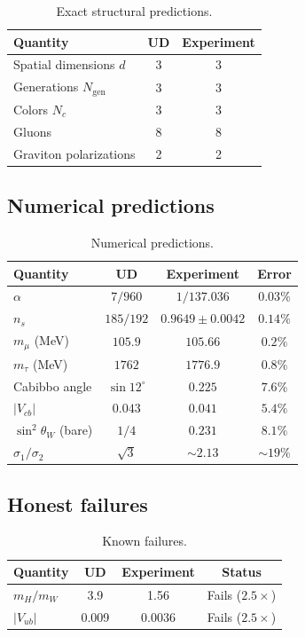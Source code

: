 \documentclass[%
 aip,
 amsmath,amssymb,
 reprint,%
]{revtex4-1}
\begin{document}
\begin{table}[h]
\caption{\label{tab:exact}Exact structural predictions.}
\begin{ruledtabular}
\begin{tabular}{lcc}
Quantity & UD & Experiment\\
\hline
Spatial dimensions $d$ & 3 & 3\\
Generations $N_\mathrm{gen}$ & 3 & 3\\
Colors $N_c$ & 3 & 3\\
Gluons & 8 & 8\\
Graviton polarizations & 2 & 2\\
\end{tabular}
\end{ruledtabular}
\end{table}

\subsection{Numerical predictions}

\begin{table}[h]
\caption{\label{tab:numerical}Numerical predictions.}
\begin{ruledtabular}
\begin{tabular}{lccc}
Quantity & UD & Experiment & Error\\
\hline
$\alpha$ & $7/960$ & $1/137.036$ & $0.03\%$\\
$n_s$ & $185/192$ & $0.9649\pm0.0042$ & $0.14\%$\\
$m_\mu$ (MeV) & $105.9$ & $105.66$ & $0.2\%$\\
$m_\tau$ (MeV) & $1762$ & $1776.9$ & $0.8\%$\\
Cabibbo angle & $\sin12^\circ$ & $0.225$ & $7.6\%$\\
$|V_{cb}|$ & $0.043$ & $0.041$ & $5.4\%$\\
$\sin^2\theta_W$ (bare) & $1/4$ & $0.231$ & $8.1\%$\\
$\sigma_1/\sigma_2$ & $\sqrt{3}$ & ${\sim}2.13$ & ${\sim}19\%$\\
\end{tabular}
\end{ruledtabular}
\end{table}

\subsection{Honest failures}

\begin{table}[h]
\caption{\label{tab:failures}Known failures.}
\begin{ruledtabular}
\begin{tabular}{lccc}
Quantity & UD & Experiment & Status\\
\hline
$m_H/m_W$ & 3.9 & 1.56 & Fails ($2.5\times$)\\
$|V_{ub}|$ & 0.009 & 0.0036 & Fails ($2.5\times$)\\
\end{tabular}
\end{ruledtabular}
\end{table}
\end{document}
